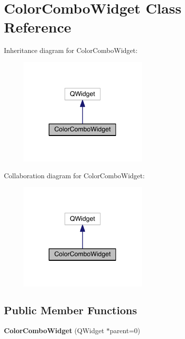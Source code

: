 \hypertarget{classColorComboWidget}{}\section{Color\+Combo\+Widget Class Reference}
\label{classColorComboWidget}


Inheritance diagram for Color\+Combo\+Widget\+:\nopagebreak
\begin{figure}[H]
\begin{center}
\leavevmode
\includegraphics[width=183pt]{classColorComboWidget__inherit__graph}
\end{center}
\end{figure}


Collaboration diagram for Color\+Combo\+Widget\+:\nopagebreak
\begin{figure}[H]
\begin{center}
\leavevmode
\includegraphics[width=183pt]{classColorComboWidget__coll__graph}
\end{center}
\end{figure}
\subsection*{Public Member Functions}
\begin{DoxyCompactItemize}
\item 
{\bfseries Color\+Combo\+Widget} (Q\+Widget $\ast$parent=0)\hypertarget{classColorComboWidget_a93259d9afb0f26c8159c60b6849f9103}{}\label{classColorComboWidget_a93259d9afb0f26c8159c60b6849f9103}

\end{DoxyCompactItemize}
